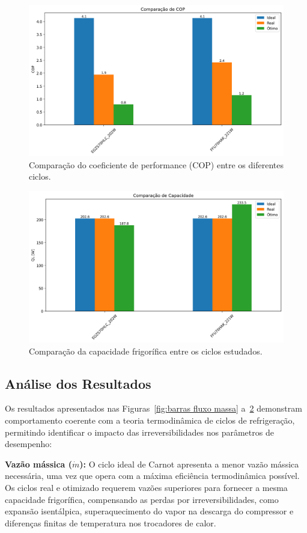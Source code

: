 \begin{figure}[ht]
    \centering
    \includegraphics[width=0.8\linewidth]{Imagens/Desenvolvimento/barras_COP.png}
    \caption{Comparação do coeficiente de performance (COP) entre os diferentes ciclos.}
    \label{fig:barras COP}
\end{figure}

\begin{figure}[ht]
    \centering
    \includegraphics[width=0.8\linewidth]{Imagens/Desenvolvimento/barras_QL.png}
    \caption{Comparação da capacidade frigorífica entre os ciclos estudados.}
    \label{fig:barras Ql}
\end{figure}

\subsection{Análise dos Resultados}

Os resultados apresentados nas Figuras~\ref{fig:barras fluxo massa} a~\ref{fig:barras Ql} demonstram comportamento coerente com a teoria termodinâmica de ciclos de refrigeração, permitindo identificar o impacto das irreversibilidades nos parâmetros de desempenho:

\textbf{Vazão mássica ($\dot{m}$):} O ciclo ideal de Carnot apresenta a menor vazão mássica necessária, uma vez que opera com a máxima eficiência termodinâmica possível. Os ciclos real e otimizado requerem vazões superiores para fornecer a mesma capacidade frigorífica, compensando as perdas por irreversibilidades, como expansão isentálpica, superaquecimento do vapor na descarga do compressor e diferenças finitas de temperatura nos trocadores de calor.

